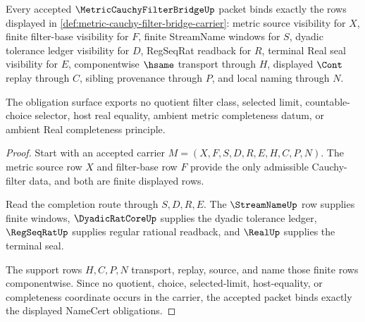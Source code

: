 \begin{theorem}
\label{thm:metric-cauchy-filter-bridge-namecert-obligations}
Every accepted $\MetricCauchyFilterBridgeUp$ packet binds exactly the rows displayed in \autoref{def:metric-cauchy-filter-bridge-carrier}: metric source visibility for $X$, finite filter-base visibility for $F$, finite StreamName windows for $S$, dyadic tolerance ledger visibility for $D$, RegSeqRat readback for $R$, terminal Real seal visibility for $E$, componentwise $\hsame$ transport through $H$, displayed $\Cont$ replay through $C$, sibling provenance through $P$, and local naming through $N$.

The obligation surface exports no quotient filter class, selected limit, countable-choice selector, host real equality, ambient metric completeness datum, or ambient Real completeness principle.
\end{theorem}
\begin{proof}
Start with an accepted carrier $M=(X,F,S,D,R,E,H,C,P,N)$. The metric source row $X$ and filter-base row $F$ provide the only admissible Cauchy-filter data, and both are finite displayed rows.

Read the completion route through $S,D,R,E$. The $\StreamNameUp$ row supplies finite windows, $\DyadicRatCoreUp$ supplies the dyadic tolerance ledger, $\RegSeqRatUp$ supplies regular rational readback, and $\RealUp$ supplies the terminal seal.

The support rows $H,C,P,N$ transport, replay, source, and name those finite rows componentwise. Since no quotient, choice, selected-limit, host-equality, or completeness coordinate occurs in the carrier, the accepted packet binds exactly the displayed NameCert obligations.
\end{proof}

